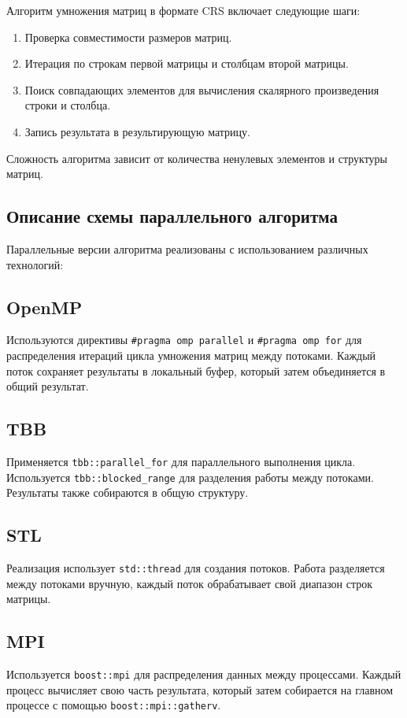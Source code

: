 \documentclass[12pt]{article}
\begin{document}
Алгоритм умножения матриц в формате CRS включает следующие шаги:
\begin{enumerate}
    \item Проверка совместимости размеров матриц.
    \item Итерация по строкам первой матрицы и столбцам второй матрицы.
    \item Поиск совпадающих элементов для вычисления скалярного произведения строки и столбца.
    \item Запись результата в результирующую матрицу.
\end{enumerate}

Сложность алгоритма зависит от количества ненулевых элементов и структуры матриц.

\newpage
\begin{center}
    \section*{Описание схемы параллельного алгоритма}
\end{center}

Параллельные версии алгоритма реализованы с использованием различных технологий:

\subsection*{OpenMP}
Используются директивы \texttt{\#pragma omp parallel} и \texttt{\#pragma omp for} для распределения итераций цикла умножения матриц между потоками. Каждый поток сохраняет результаты в локальный буфер, который затем объединяется в общий результат.

\subsection*{TBB}
Применяется \texttt{tbb::parallel\_for} для параллельного выполнения цикла. Используется \texttt{tbb::blocked\_range} для разделения работы между потоками. Результаты также собираются в общую структуру.

\subsection*{STL}
Реализация использует \texttt{std::thread} для создания потоков. Работа разделяется между потоками вручную, каждый поток обрабатывает свой диапазон строк матрицы.

\subsection*{MPI}
Используется \texttt{boost::mpi} для распределения данных между процессами. Каждый процесс вычисляет свою часть результата, который затем собирается на главном процессе с помощью \texttt{boost::mpi::gatherv}.
\end{document}
